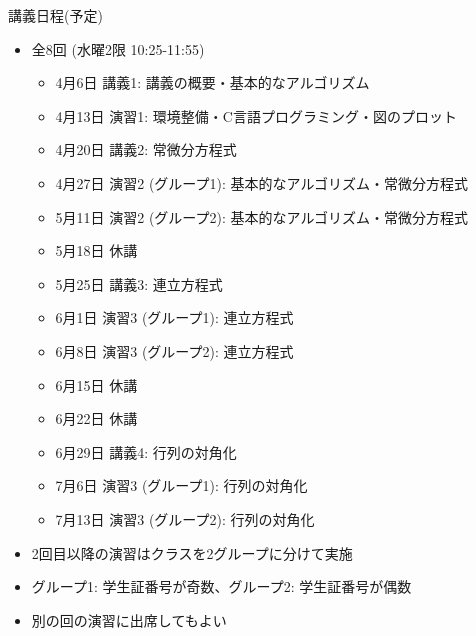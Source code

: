\begin{frame}[t]{講義日程(予定)}
  \begin{itemize}
  \item 全8回 (水曜2限 10:25-11:55)
    \begin{itemize}
    \item 4月6日 講義1: 講義の概要・基本的なアルゴリズム
    \item 4月13日 演習1: 環境整備・C言語プログラミング・図のプロット
    \item 4月20日 講義2: 常微分方程式
    \item 4月27日 演習2 (グループ1): 基本的なアルゴリズム・常微分方程式
    \item 5月11日 演習2 (グループ2): 基本的なアルゴリズム・常微分方程式
    \item 5月18日 休講
    \item 5月25日 講義3: 連立方程式
    \item 6月1日 演習3 (グループ1): 連立方程式
    \item 6月8日 演習3 (グループ2): 連立方程式
    \item 6月15日 休講
    \item 6月22日 休講
    \item 6月29日 講義4: 行列の対角化
    \item 7月6日 演習3 (グループ1): 行列の対角化
    \item 7月13日 演習3 (グループ2): 行列の対角化
    \end{itemize}
  \item 2回目以降の演習はクラスを2グループに分けて実施
  \item グループ1: 学生証番号が奇数、グループ2: 学生証番号が偶数
  \item 別の回の演習に出席してもよい
  \end{itemize}
\end{frame}

